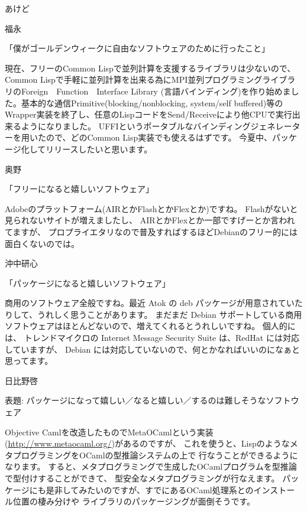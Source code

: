 \documentclass[cjk,dvipdfmx,12pt]{beamer}
\begin{document}
\begin{frame}{あけど}
\end{frame}\begin{frame}{福永}

「僕がゴールデンウィークに自由なソフトウェアのために行ったこと」

現在、フリーのCommon Lispで並列計算を支援するライブラリは少ないので、
Common Lispで手軽に並列計算を出来る為にMPI並列プログラミングライブラリのForeign　Function　Interface
Library (言語バインディング)を作り始めました。基本的な通信Primitive(blocking/nonblocking,
system/self buffered)等のWrapper実装を終了し、任意のLispコードをSend/Receiveにより他CPUで実行出来るようになりました。
UFFIというポータブルなバインディングジェネレーターを用いたので、どのCommon Lisp実装でも使えるはずです。
今夏中、パッケージ化してリリースしたいと思います。

\end{frame}\begin{frame}{奥野}

「フリーになると嬉しいソフトウェア」

Adobeのプラットフォーム(AIRとかFlashとかFlexとか)ですね。
Flashがないと見られないサイトが増えましたし、
AIRとかFlexとか一部ですげーとか言われてますが、
プロプライエタリなので普及すればするほどDebianのフリー的には面白くないのでは。

\end{frame}\begin{frame}{沖中研心}

「パッケージになると嬉しいソフトウェア」

商用のソフトウェア全般ですね。最近 Atok の deb パッケージが用意されていたりして、うれしく思うことがあります。
まだまだ Debian サポートしている商用ソフトウェアはほとんどないので、増えてくれるとうれしいですね。
個人的には、 トレンドマイクロの Internet Message Security Suite は、RedHat には対応していますが、
Debian には対応していないので、何とかなればいいのになぁと思ってます。

\end{frame}\begin{frame}{日比野啓}

表題: パッケージになって嬉しい／なると嬉しい／するのは難しそうなソフトウェア

Objective Camlを改造したものでMetaOCamlという実装(\url{http://www.metaocaml.org/})があるのですが、
これを使うと、LispのようなメタプログラミングをOCamlの型推論システムの上で
行なうことができるようになります。
すると、メタプログラミングで生成したOCamlプログラムを型推論で型付けすることができて、
型安全なメタプログラミングが行なえます。
パッケージにも是非してみたいのですが、すでにあるOCaml処理系とのインストール位置の棲み分けや
ライブラリのパッケージングが面倒そうです。


\end{frame}
\end{document}
